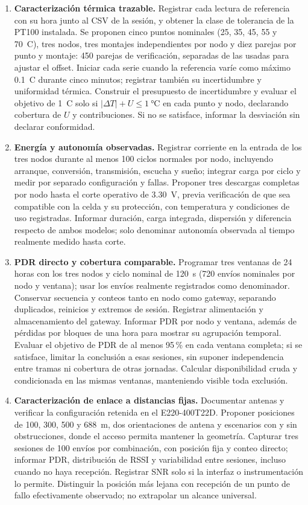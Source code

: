 \begin{enumerate}
\item \textbf{Caracterización térmica trazable.} Registrar cada lectura de referencia con su hora junto al CSV de la sesión, y obtener la clase de tolerancia de la PT100 instalada. Se proponen cinco puntos nominales (25, 35, 45, 55 y 70~\textdegree C), tres nodos, tres montajes independientes por nodo y diez parejas por punto y montaje: 450 parejas de verificación, separadas de las usadas para ajustar el offset. Iniciar cada serie cuando la referencia varíe como máximo 0.1~\textdegree C durante cinco minutos; registrar también su incertidumbre y uniformidad térmica. Construir el presupuesto de incertidumbre y evaluar el objetivo de 1~\textdegree C solo si $|\Delta T|+U\leq\SI{1}{\celsius}$ en cada punto y nodo, declarando cobertura de $U$ y contribuciones. Si no se satisface, informar la desviación sin declarar conformidad.

\item \textbf{Energía y autonomía observadas.} Registrar corriente en la entrada de los tres nodos durante al menos 100 ciclos normales por nodo, incluyendo arranque, conversión, transmisión, escucha y sueño; integrar carga por ciclo y medir por separado configuración y fallas. Proponer tres descargas completas por nodo hasta el corte operativo de 3.30~V, previa verificación de que sea compatible con la celda y su protección, con temperatura y condiciones de uso registradas. Informar duración, carga integrada, dispersión y diferencia respecto de ambos modelos; solo denominar autonomía observada al tiempo realmente medido hasta corte.

\item \textbf{PDR directo y cobertura comparable.} Programar tres ventanas de 24 horas con los tres nodos y ciclo nominal de 120~s (720 envíos nominales por nodo y ventana); usar los envíos realmente registrados como denominador. Conservar secuencia y conteos tanto en nodo como gateway, separando duplicados, reinicios y extremos de sesión. Registrar alimentación y almacenamiento del gateway. Informar PDR por nodo y ventana, además de pérdidas por bloques de una hora para mostrar su agrupación temporal. Evaluar el objetivo de PDR de al menos 95\,\% en cada ventana completa; si se satisface, limitar la conclusión a esas sesiones, sin suponer independencia entre tramas ni cobertura de otras jornadas. Calcular disponibilidad cruda y condicionada en las mismas ventanas, manteniendo visible toda exclusión.

\item \textbf{Caracterización de enlace a distancias fijas.} Documentar antenas y verificar la configuración retenida en el E220-400T22D. Proponer posiciones de 100, 300, 500 y 688~m, dos orientaciones de antena y escenarios con y sin obstrucciones, donde el acceso permita mantener la geometría. Capturar tres sesiones de 100 envíos por combinación, con posición fija y conteo directo; informar PDR, distribución de RSSI y variabilidad entre sesiones, incluso cuando no haya recepción. Registrar SNR solo si la interfaz o instrumentación lo permite. Distinguir la posición más lejana con recepción de un punto de fallo efectivamente observado; no extrapolar un alcance universal.


\end{enumerate}

